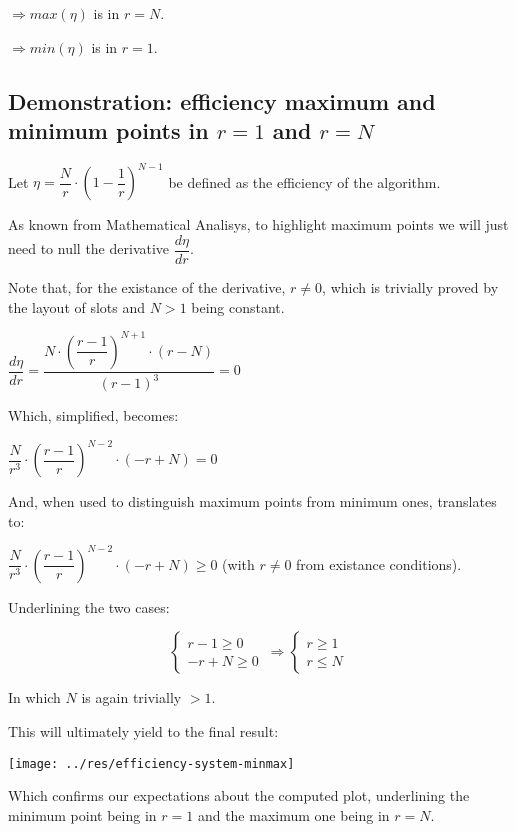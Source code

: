 \documentclass[a4paper,11pt]{article} %
\begin{document}
\smallskip

$\Rightarrow max(\eta)$ is in $r = N$.

\smallskip

$\Rightarrow min(\eta)$ is in $r = 1$.

\subsection{Demonstration: efficiency maximum and minimum points in $r = 1$ and $r = N$}

Let $\eta = \dfrac{N}{r} \cdot \left(1 - \dfrac{1}{r}\right)^{N-1}$ be defined as the efficiency of the algorithm.

\medskip

As known from Mathematical Analisys, to highlight maximum points we will just need to null the derivative $\dfrac{d \eta}{d r}$.

\medskip

Note that, for the existance of the derivative, $r \neq 0$, which is trivially proved by the layout of slots and $N > 1$ being constant.

\medskip

$\dfrac{d \eta}{d r} = \dfrac{N \cdot \left(\dfrac{r-1}{r}\right)^{N+1} \cdot \left(r - N\right)}{\left(r - 1\right)^3} = 0$

\bigskip

Which, simplified, becomes:

\medskip

$\dfrac{N}{r^3} \cdot \left(\dfrac{r - 1}{r}\right)^{N-2} \cdot (-r + N) = 0$

\bigskip

And, when used to distinguish maximum points from minimum ones, translates to:

\medskip

$\dfrac{N}{r^3} \cdot \left(\dfrac{r - 1}{r}\right)^{N-2} \cdot (-r + N) \geq 0$ (with $r \neq 0$ from existance conditions).

\bigskip

Underlining the two cases:

\begin{equation*}
    \begin{cases}
        r-1 \geq 0\\
        -r+N \geq 0
    \end{cases}\,\Rightarrow
    \begin{cases}
        r \geq 1\\
        r \leq N
    \end{cases}\,
\end{equation*}

\medskip

In which $N$ is again trivially $> 1$.

\bigskip

This will ultimately yield to the final result:

\texttt{[image: ../res/efficiency-system-minmax]}

\smallskip

Which confirms our expectations about the computed plot, underlining the minimum point being in $r = 1$ and the maximum one being in $r = N$.
\end{document}
